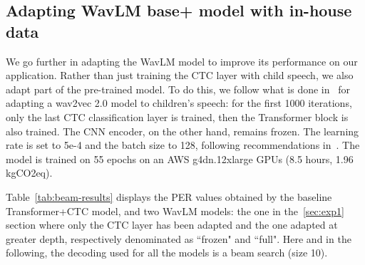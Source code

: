 \documentclass{Interspeech2024}
\begin{document}
\subsection{Adapting WavLM base+ model with in-house data}

We go further in adapting the WavLM model to improve its performance on our application. Rather than just training the CTC layer with child speech, we also adapt part of the pre-trained model. To do this, we follow what is done in~\cite{Jain2023-AWB} for adapting a wav2vec 2.0 model to children's speech: for the first 1000 iterations, only the last CTC classification layer is trained, then the Transformer block is also trained. The CNN encoder, on the other hand, remains frozen. The learning rate is set to 5e-4 and the batch size to 128, following recommendations in~\cite{Chen2022-wavlm}. The model is trained on 55 epochs on an AWS g4dn.12xlarge GPUs (8.5 hours, 1.96 kgCO2eq).

Table~\ref{tab:beam-results} displays the PER values obtained by the baseline Transformer+CTC model, and two WavLM models: the one in the~\ref{sec:exp1} section where only the CTC layer has been adapted and the one adapted at greater depth, respectively denominated as ``frozen" and ``full". Here and in the following, the decoding used for all the models is a beam search (size 10).
\end{document}
